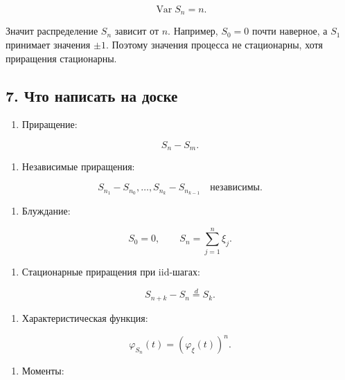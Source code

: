 \documentclass[
  11pt,
  a4paper,
]{article}
\providecommand{\tightlist}{%
  \setlength{\itemsep}{0pt}\setlength{\parskip}{0pt}}
\begin{document}
\[
\operatorname{Var}S_n=n.
\]

Значит распределение \(S_n\) зависит от \(n\). Например, \(S_0=0\) почти
наверное, а \(S_1\) принимает значения \(\pm1\). Поэтому значения
процесса не стационарны, хотя приращения стационарны.

\subsection{7. Что написать на
доске}\label{ux447ux442ux43e-ux43dux430ux43fux438ux441ux430ux442ux44c-ux43dux430-ux434ux43eux441ux43aux435}

\begin{enumerate}
\def\labelenumi{\arabic{enumi}.}
\tightlist
\item
  Приращение:
\end{enumerate}

\[
S_n-S_m.
\]

\begin{enumerate}
\def\labelenumi{\arabic{enumi}.}
\setcounter{enumi}{1}
\tightlist
\item
  Независимые приращения:
\end{enumerate}

\[
S_{n_1}-S_{n_0},\ldots,S_{n_k}-S_{n_{k-1}}
\quad\text{независимы}.
\]

\begin{enumerate}
\def\labelenumi{\arabic{enumi}.}
\setcounter{enumi}{2}
\tightlist
\item
  Блуждание:
\end{enumerate}

\[
S_0=0,
\qquad
S_n=\sum_{j=1}^n\xi_j.
\]

\begin{enumerate}
\def\labelenumi{\arabic{enumi}.}
\setcounter{enumi}{3}
\tightlist
\item
  Стационарные приращения при iid-шагах:
\end{enumerate}

\[
S_{n+k}-S_n\stackrel d=S_k.
\]

\begin{enumerate}
\def\labelenumi{\arabic{enumi}.}
\setcounter{enumi}{4}
\tightlist
\item
  Характеристическая функция:
\end{enumerate}

\[
\varphi_{S_n}(t)=\left(\varphi_\xi(t)\right)^n.
\]

\begin{enumerate}
\def\labelenumi{\arabic{enumi}.}
\setcounter{enumi}{5}
\tightlist
\item
  Моменты:
\end{enumerate}
\end{document}
